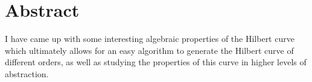 \documentclass[12pt]{article}
\begin{document}
 
  
  \vspace{-1.8cm}


\newpage

\section*{Abstract}
I have came up with some interesting algebraic properties of the Hilbert curve which ultimately allows for an easy algorithm to generate the Hilbert curve of different orders, as well as studying the properties of this curve in higher levels of abstraction.
\end{document}
